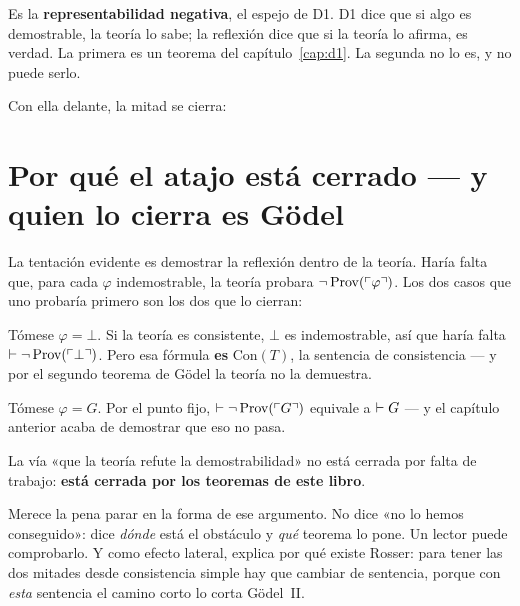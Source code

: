 

Es la \textbf{representabilidad negativa}, el espejo de D1. D1 dice que si algo es demostrable, la
teoría lo sabe; la reflexión dice que si la teoría lo afirma, es verdad. La primera es un teorema
del capítulo~\ref{cap:d1}. La segunda no lo es, y no puede serlo.

Con ella delante, la mitad se cierra:




\section{Por qué el atajo está cerrado — y quien lo cierra es Gödel}

La tentación evidente es demostrar la reflexión dentro de la teoría. Haría falta que, para cada
$\varphi$ indemostrable, la teoría probara $\lnot\operatorname{Prov}(\ulcorner \varphi \urcorner)$. Los dos casos que uno
probaría primero son los dos que lo cierran:

\begin{muro}
Tómese $\varphi = \bot$. Si la teoría es consistente, $\bot$ es indemostrable, así que haría falta
$\vdash \lnot\operatorname{Prov}(\ulcorner \bot \urcorner)$. Pero esa fórmula \textbf{es} $\mathrm{Con}(T)$, la sentencia
de consistencia — y por el segundo teorema de Gödel la teoría no la demuestra.

Tómese $\varphi = G$. Por el punto fijo, $\vdash \lnot\operatorname{Prov}(\ulcorner G \urcorner)$ equivale a
$\vdash G$ — y el capítulo anterior acaba de demostrar que eso no pasa.

La vía «que la teoría refute la demostrabilidad» no está cerrada por falta de trabajo:
\textbf{está cerrada por los teoremas de este libro}.
\end{muro}

\begin{leccion}
Merece la pena parar en la forma de ese argumento. No dice «no lo hemos conseguido»: dice
\emph{dónde} está el obstáculo y \emph{qué} teorema lo pone. Un lector puede comprobarlo. Y como
efecto lateral, explica por qué existe Rosser: para tener las dos mitades desde consistencia simple
hay que cambiar de sentencia, porque con \emph{esta} sentencia el camino corto lo corta Gödel~II.
\end{leccion}

